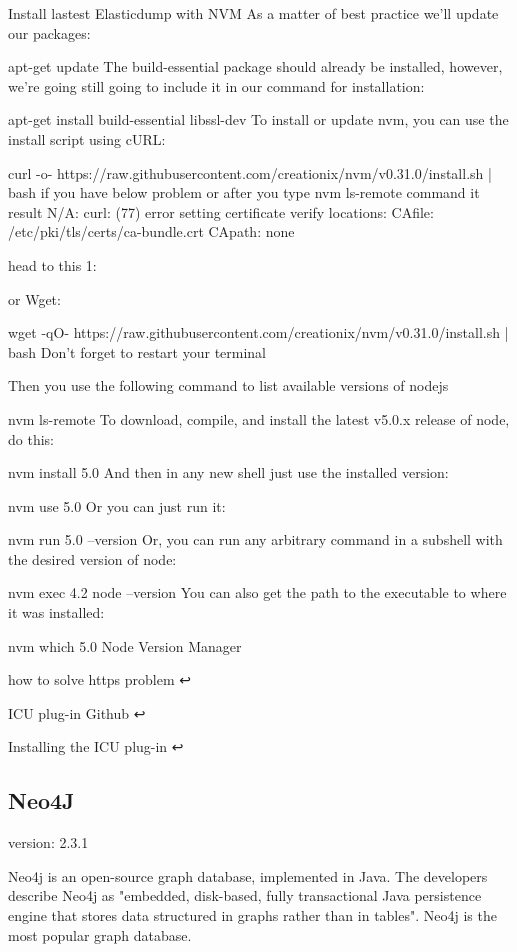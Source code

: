 {Install lastest Elasticdump with NVM
As a matter of best practice we’ll update our packages:

apt-get update
The build-essential package should already be installed, however, we’re going still going to include it in our command for installation:

apt-get install build-essential libssl-dev
To install or update nvm, you can use the install script using cURL:

curl -o- https://raw.githubusercontent.com/creationix/nvm/v0.31.0/install.sh | bash
if you have below problem or after you type nvm ls-remote command it result N/A: curl: (77) error setting certificate verify locations: CAfile: /etc/pki/tls/certs/ca-bundle.crt CApath: none

head to this 1:

or Wget:

wget -qO- https://raw.githubusercontent.com/creationix/nvm/v0.31.0/install.sh | bash
Don't forget to restart your terminal

Then you use the following command to list available versions of nodejs

nvm ls-remote
To download, compile, and install the latest v5.0.x release of node, do this:

nvm install 5.0
And then in any new shell just use the installed version:

nvm use 5.0
Or you can just run it:

nvm run 5.0 --version
Or, you can run any arbitrary command in a subshell with the desired version of node:

nvm exec 4.2 node --version
You can also get the path to the executable to where it was installed:

nvm which 5.0
Node Version Manager

how to solve https problem ↩

ICU plug-in Github ↩

Installing the ICU plug-in ↩

\subsection{Neo4J}

version: 2.3.1

Neo4j is an open-source graph database, implemented in Java. The developers describe Neo4j as "embedded, disk-based, fully transactional Java persistence engine that stores data structured in graphs rather than in tables". Neo4j is the most popular graph database.

}
